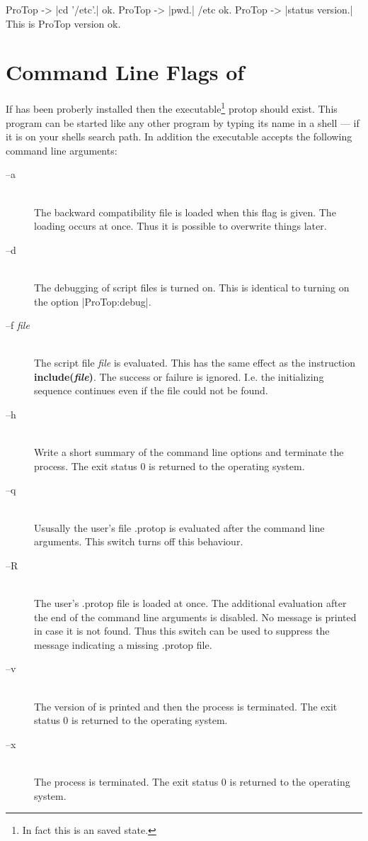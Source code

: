 \begin{BoxedSample}
  ProTop -> |cd '/etc'.|
  ok.
  ProTop -> |pwd.|
  /etc
  ok.
  ProTop -> |status version.|
    This is ProTop version \Version
  ok.
\end{BoxedSample}



\section{Command Line Flags of \ProTop}

If \ProTop{} has been proberly installed then the executable\footnote{In fact
  this is an \eclipse{} saved state.} {\sf protop} should exist. This program
can be started like any other program by typing its name in a shell --- if it
is on your shells search path.  In addition the executable accepts the
following command line arguments:

\begin{description}
\item[--a]\ \\
  The backward compatibility file is loaded when this flag is given. The
  loading occurs at once. Thus it is possible to overwrite things later.
\item[--d]\ \\
  The debugging of script files is turned on. This is identical to turning on
  the option |ProTop:debug|.
\item[--f {\em file}]\ \\
  The script file {\em file}\/ is evaluated. This has the same effect as the
  \ProTop{} instruction {\bf include({\em file}\/)}. The success or failure is
  ignored. I.e. the initializing sequence continues even if the file could not
  be found.
\item[--h]\ \\ Write a short summary of the command line options and terminate
  the \ProTop{} process. The exit status 0 is returned to the operating
  system.
\item[--q]\ \\
  Ususally the user's file {\sf .protop} is evaluated after the command line
  arguments. This switch turns off this behaviour.
\item[--R]\ \\
  The user's {\sf .protop} file is loaded at once. The additional evaluation
  after the end of the command line arguments is disabled. No message is
  printed in case it is not found. Thus this switch can be used to suppress
  the message indicating a missing {\sf .protop} file.
\item[--v]\ \\ The version of \ProTop{} is printed and then the \ProTop{}
  process is terminated. The exit status 0 is returned to the operating
  system.
\item[--x]\ \\
  The \ProTop{} process is terminated. The exit status 0 is returned to the
  operating system.
\end{description}

